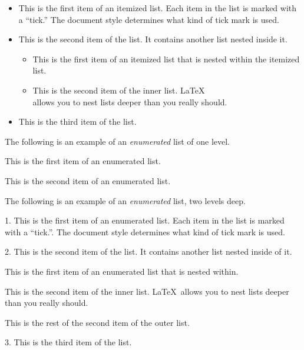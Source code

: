 \documentclass[aoas]{imsart}
\providecommand{\tightlist}{%
  \setlength{\itemsep}{0pt}\setlength{\parskip}{0pt}}
\numberwithin{equation}{section}
\theoremstyle{plain}
\theoremstyle{remark}
\begin{document}
\begin{itemize}
\tightlist
\item
  This is the first item of an itemized list. Each item in the list is
  marked with a ``tick.'' The document style determines what kind of
  tick mark is used.
\item
  This is the second item of the list. It contains another list nested
  inside it.

  \begin{itemize}
  \tightlist
  \item
    This is the first item of an itemized list that is nested within the
    itemized list.
  \item
    This is the second item of the inner list. \LaTeX\\
    allows you to nest lists deeper than you really should.
  \end{itemize}
\item
  This is the third item of the list.
\end{itemize}

The following is an example of an \emph{enumerated} list of one level.

\begin{longlist}
\item This is the first item of an enumerated list.
\item This is the second item of an enumerated list.
\end{longlist}

The following is an example of an \emph{enumerated} list, two levels
deep.

\begin{longlist}
\item[1.]
This is the first item of an enumerated list.  Each item
in the list is marked with a ``tick.''.  The document
style determines what kind of tick mark is used.
\item[2.]
This is the second item of the list.  It contains another
list nested inside of it.
\begin{longlist}
\item
This is the first item of an enumerated list that
is nested within.  
\item
This is the second item of the inner list.  \LaTeX\
allows you to nest lists deeper than you really should.
\end{longlist}
This is the rest of the second item of the outer list.
\item[3.]
This is the third item of the list.
\end{longlist}
\end{document}
